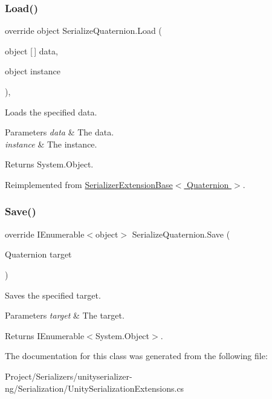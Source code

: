 \subsubsection{\texorpdfstring{Load()}{Load()}}
{\footnotesize\ttfamily override object Serialize\+Quaternion.\+Load (\begin{DoxyParamCaption}\item[{object \mbox{[}$\,$\mbox{]}}]{data,  }\item[{object}]{instance }\end{DoxyParamCaption})\hspace{0.3cm}{\ttfamily [inline]}, {\ttfamily [virtual]}}



Loads the specified data. 


\begin{DoxyParams}{Parameters}
{\em data} & The data.\\
\hline
{\em instance} & The instance.\\
\hline
\end{DoxyParams}
\begin{DoxyReturn}{Returns}
System.\+Object.
\end{DoxyReturn}


Reimplemented from \hyperlink{class_serializer_extension_base_a3792a9b27056e30ca0ac91531936ae47}{Serializer\+Extension\+Base$<$ Quaternion $>$}.

\mbox{\label{class_serialize_quaternion_aac8d597d978662eb8943fc54964ba947}} 
\subsubsection{\texorpdfstring{Save()}{Save()}}
{\footnotesize\ttfamily override I\+Enumerable$<$object$>$ Serialize\+Quaternion.\+Save (\begin{DoxyParamCaption}\item[{Quaternion}]{target }\end{DoxyParamCaption})\hspace{0.3cm}{\ttfamily [inline]}}



Saves the specified target. 


\begin{DoxyParams}{Parameters}
{\em target} & The target.\\
\hline
\end{DoxyParams}
\begin{DoxyReturn}{Returns}
I\+Enumerable$<$System.\+Object$>$.
\end{DoxyReturn}


The documentation for this class was generated from the following file\+:\begin{DoxyCompactItemize}
\item 
Project/\+Serializers/unityserializer-\/ng/\+Serialization/Unity\+Serialization\+Extensions.\+cs\end{DoxyCompactItemize}
